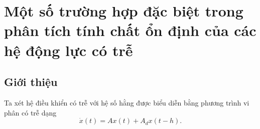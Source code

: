 \chapter{Một số trường hợp đặc biệt trong phân tích tính chất ổn định của các hệ động lực có trễ}\label{Chap2}
\setlength{\parindent}{6.5ex}

\section{Giới thiệu}
Ta xét hệ điều khiển có trễ với hệ số hằng được biểu diễn bằng phương trình vi phân có trễ dạng
\begin{equation}\label{eq1}
	\dot{x}(t)=Ax(t) + A_dx(t -h). 
\end{equation}
